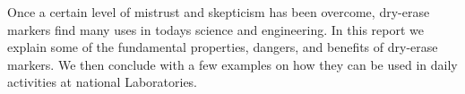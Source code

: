     Once a certain level of mistrust and skepticism has been
    overcome, dry-erase markers find many uses in todays science and
    engineering. In this report we explain some of the fundamental
    properties, dangers, and benefits of dry-erase markers. We then
    conclude with a few examples on how they can be used in daily
    activities at national Laboratories.
